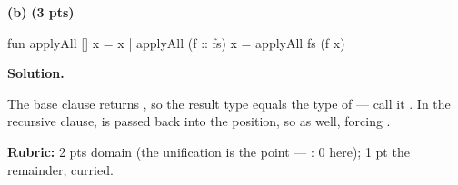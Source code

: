 \documentclass[crop=false]{standalone}
\newif\ifsol
\newenvironment{solution}
    {\par\color{solution_color}\begin{framed}\textbf{Solution.}\par}
    {\end{framed}}
\newcommand{\subpts}[1]{\textbf{(#1 pts)}}
\newcommand{\answerspace}[1]{\ifsol\else\vspace{#1}\par\fi}
\begin{document}
\vspace{0.5em}

\textbf{(b)} \subpts{3}

\begin{codeblock}
  fun applyAll [] x = x
    | applyAll (f :: fs) x = applyAll fs (f x)
\end{codeblock}

\answerspace{3cm}

\begin{solution}

The base clause returns , so the result type equals the type of
 --- call it . In the recursive clause,  is
passed back into the  position, so  as well,
forcing .

\textbf{Rubric:} 2 pts  domain (the unification
is the point --- : 0 here); 1 pt the
 remainder, curried.
\end{solution}








\end{document}
